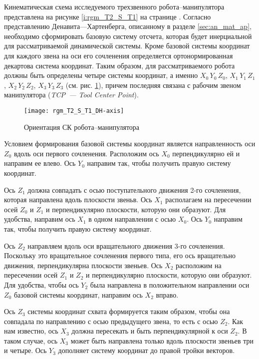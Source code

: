 \documentclass[oneside, final, 14pt]{extarticle}
\begin{document}
Кинематическая схема исследуемого трехзвенного робота--манипулятора представлена на рисунке \ref{i:rgm_T2_S_T1} на странице \pageref{i:rgm_T2_S_T1}.
Согласно представлению Денавита---Хартенберга, описанному в разделе \ref{sec:an_mat_ap}, необходимо сформировать базовую систему отсчета, которая будет инерциальной для рассматриваемой динамической системы.
Кроме базовой системы координат для каждого звена на оси его сочленения определяется ортонормированная декартова система координат.
Таким образом, для рассматриваемого робота должны быть определены четыре системы координат, а именно \(X_0\,Y_0\,Z_0\), \(X_1\,Y_1\,Z_1\), \(X_2\,Y_2\,Z_2\), \(X_3\,Y_3\,Z_3\) (см. рис. \ref{i:rgm_T2_S_T1_DH-axis}), причем последняя связана с рабочим звеном манипулятора ({\itshape TCP~--- Tool Center Point}).
\begin{figure}[h]
  \centering
  \texttt{[image: rgm\_T2\_S\_T1\_DH-axis]}
  \caption{Ориентация СК робота--манипулятора}
  \label{i:rgm_T2_S_T1_DH-axis}
\end{figure}
\par
Условием формирования базовой системы координат является направленность оси \(Z_0\) вдоль оси первого сочленения.
Расположим ось \(X_0\) перпендикулярно ей и направим ее влево.
Ось \(Y_0\) направим так, чтобы получить правую систему координат.
\par
Ось \(Z_1\) должна совпадать с осью поступательного движения 2-го сочленения, которая направлена вдоль плоскости звеньв.
Ось \(X_1\) располагаем на пересечении осей \(Z_0\) и \(Z_1\) и перпендикулярно плоскости, которую они образуют.
Для удобства, направим ось \(X_1\) в одном направлении с осью \(X_0\).
Ось \(Y_0\) направим так, чтобы получить правую систему координат.
\par
Ось \(Z_2\) направляем вдоль оси вращательного движения 3-го сочленения.
Поскольку это вращательное сочленения первого типа, его ось вращательно движения, перпендикулярна плоскости звеньев.
Ось \(X_2\) расположим на пересечении осей \(Z_1\) и \(Z_2\) и перпендикулярно плоскости, которую они образуют.
Для удобства, чтобы ось \(Y_2\) была направлена в положительном направлении оси \(Z_0\) базовой системы координат, направим ось \(X_2\) вправо.
\par
Ось \(Z_3\) системы координат схвата формируется таким образом, чтобы она совпадала по направлению с осью предыдущего звена, то есть с осью \(Z_2\).
Как нам известно, ось \(X_3\) должна пересекать и быть перпендикулярной к оси \(Z_2\).
В таком случае, ось \(X_3\) может быть направлена только вдоль плоскости звеньев три и четыре.
Ось \(Y_3\) дополняет систему координат до правой тройки векторов.
\end{document}
